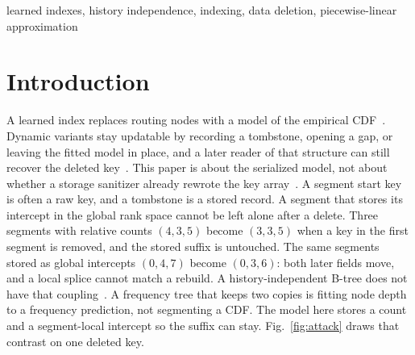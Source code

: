 \documentclass[conference]{IEEEtran}
\begin{document}
\begin{IEEEkeywords}
learned indexes, history independence, indexing, data deletion, piecewise-linear approximation
\end{IEEEkeywords}

\section{Introduction}

A learned index replaces routing nodes with a model of the empirical CDF~\cite{kraska2018,ferragina2020pgm}.
Dynamic variants stay updatable by recording a tombstone, opening a gap, or leaving the fitted model in place, and a later reader of that structure can still recover the deleted key~\cite{ferragina2020pgm,ding2020alex,wu2021lipp}.
This paper is about the serialized model, not about whether a storage sanitizer already rewrote the key array~\cite{shastri2020,sarkar2023lethe,wagner2024dbsanitizer}.
A segment start key is often a raw key, and a tombstone is a stored record.
A segment that stores its intercept in the global rank space cannot be left alone after a delete.
Three segments with relative counts $(4,3,5)$ become $(3,3,5)$ when a key in the first segment is removed, and the stored suffix is untouched.
The same segments stored as global intercepts $(0,4,7)$ become $(0,3,6)$: both later fields move, and a local splice cannot match a rebuild.
A history-independent B-tree does not have that coupling~\cite{bender2016}.
A frequency tree that keeps two copies is fitting node depth to a frequency prediction, not segmenting a CDF.
The model here stores a count and a segment-local intercept so the suffix can stay.
Fig.~\ref{fig:attack} draws that contrast on one deleted key.
\end{document}
